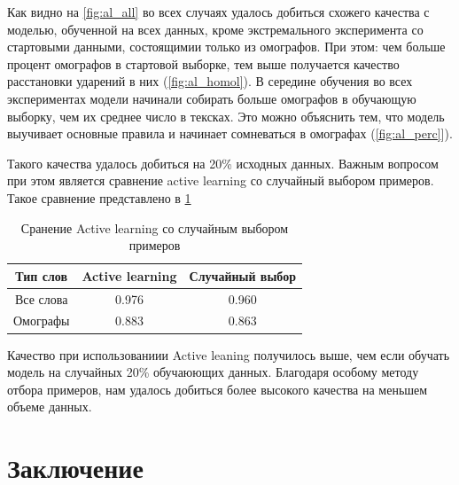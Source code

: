 \documentclass[14pt, a4paper, russian]{extreport}
\begin{document}
Как видно на \cref{fig:al_all} во всех случаях удалось добиться схожего качества с моделью, обученной на всех данных, кроме экстремального эксперимента со стартовыми данными, состоящимии только из омографов. При этом: чем больше процент омографов в стартовой выборке, тем выше получается качество расстановки ударений в них (\cref{fig:al_homol}). В середине обучения во всех экспериментах модели начинали собирать больше омографов в обучающую выборку, чем их среднее число в тексках. Это можно объяснить тем, что модель выучивает основные правила и начинает сомневаться в омографах (\cref{fig:al_perc}]).
 
 Такого качества удалось добиться на 20\% исходных данных. Важным вопросом при этом является сравнение active learning со случайный выбором примеров.  Такое сравнение представлено в \cref{table:al}

\begin{table}[H]
	\caption{Сранение Active learning со случайным выбором примеров}
	
	\begin{small}
		\begin{center}
			\begin{tabular}{|c | c | c |}
				\hline
				Тип слов  &  Active learning & Случайный выбор \\ \hline
				Все слова & 0.976          & 0.960            \\ \hline
				Омографы  & 0.883          & 0.863      \\ \hline
			\end{tabular}
		\end{center}
	\end{small}
	\label{table:al}
\end{table}

Качество при использованиии Active leaning получилось выше, чем если обучать модель на случайных 20\% обучаюющих данных. Благодаря особому методу отбора примеров, нам удалось добиться более высокого качества на меньшем объеме данных. 



\newpage
\chapter*{Заключение}
\end{document}
